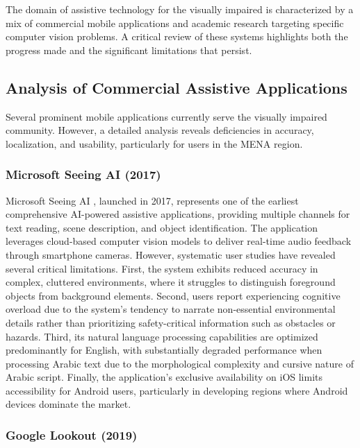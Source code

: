 \documentclass[a4paper]{report}
\begin{document}
The domain of assistive technology for the visually impaired is characterized by a mix of commercial mobile applications and academic research targeting specific computer vision problems. A critical review of these systems highlights both the progress made and the significant limitations that persist.

\subsection{Analysis of Commercial Assistive Applications}
\label{subsec:commercial-apps}

Several prominent mobile applications currently serve the visually impaired community. However, a detailed analysis reveals deficiencies in accuracy, localization, and usability, particularly for users in the MENA region.

\subsubsection{Microsoft Seeing AI (2017)}

Microsoft Seeing AI \cite{microsoft_seeingai}, launched in 2017, represents one of the earliest comprehensive AI-powered assistive applications, providing multiple channels for text reading, scene description, and object identification. The application leverages cloud-based computer vision models to deliver real-time audio feedback through smartphone cameras. However, systematic user studies have revealed several critical limitations. First, the system exhibits reduced accuracy in complex, cluttered environments, where it struggles to distinguish foreground objects from background elements. Second, users report experiencing cognitive overload due to the system's tendency to narrate non-essential environmental details rather than prioritizing safety-critical information such as obstacles or hazards. Third, its natural language processing capabilities are optimized predominantly for English, with substantially degraded performance when processing Arabic text due to the morphological complexity and cursive nature of Arabic script. Finally, the application's exclusive availability on iOS limits accessibility for Android users, particularly in developing regions where Android devices dominate the market.

\subsubsection{Google Lookout (2019)}
\end{document}
